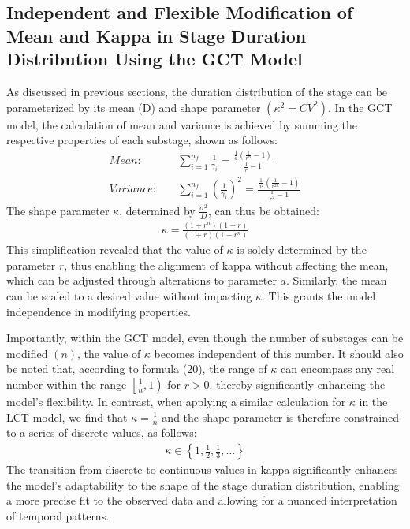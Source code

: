 \documentclass[12pt]{article}
\begin{document}
\subsection{Independent and Flexible Modification of Mean and Kappa in Stage Duration Distribution Using the GCT Model}
As discussed in previous sections, the duration distribution of the stage can be parameterized by its mean (D) and shape parameter $(\kappa^2 = CV^2)$. In the GCT model, the calculation of mean and variance is achieved by summing the respective properties of each substage, shown as follows:
\begin{align}
    Mean: \quad  &\sum_{i=1}^{n_f} \frac{1}{\gamma_i} = \frac{\frac{1}{a} (\frac{1}{r^n} - 1)}{\frac{1}{r} -1} \\
    Variance: \quad &\sum_{i=1}^{n_f} \left(\frac{1}{\gamma_i} \right)^2 = \frac{\frac{1}{a^2} (\frac{1}{r^{2n}} - 1)}{\frac{1}{r^2} -1}
\end{align}
The shape parameter $\kappa$, determined by $\frac{\sigma^2}{D}$, can thus be obtained:
\begin{align}
    \kappa = \frac{(1+r^{n}) (1-r)}{(1+r) (1-r^{n})}
\end{align}
This simplification revealed that the value of $\kappa$ is solely determined by the parameter $r$, thus enabling the alignment of kappa without affecting the mean, which can be adjusted through alterations to parameter $a$. Similarly, the mean can be scaled to a desired value without impacting $\kappa$. This grants the model independence in modifying properties.

Importantly, within the GCT model, even though the number of substages can be modified $(n)$, the value of $\kappa$ becomes independent of this number. It should also be noted that, according to formula (20), the range of $\kappa$ can encompass any real number within the range $\left[ \frac{1}{n}, 1 \right)$ for $r > 0$, thereby significantly enhancing the model's flexibility. In contrast, when applying a similar calculation for $\kappa$ in the LCT model, we find that $\kappa = \frac{1}{n}$ and the shape parameter is therefore constrained to a series of discrete values, as follows:
\begin{align*}
    \kappa \in \left\{ 1, \frac{1}{2}, \frac{1}{3}, \dots \right\}
\end{align*}
The transition from discrete to continuous values in kappa significantly enhances the model's adaptability to the shape of the stage duration distribution, enabling a more precise fit to the observed data and allowing for a nuanced interpretation of temporal patterns.
\end{document}
